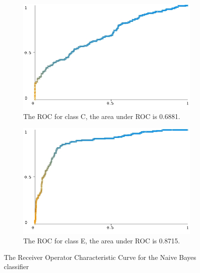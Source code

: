 \documentclass[10pt]{article}
\begin{document}
\begin{figure}
\begin{subfigure}[b]{0.475\textwidth}
        \centering 
        \includegraphics[width=\textwidth]{bayes_roc/roc_curve_c.jpg}
        \caption[]%
        {{\small The ROC for class C, the area under ROC is 0.6881.}}    
        \label{fig:bayes roc curve class c}
    \end{subfigure}
    \quad
    \begin{subfigure}[b]{0.475\textwidth}   
        \centering 
        \includegraphics[width=\textwidth]{bayes_roc/roc_curve_e(d).jpg}
        \caption[]%
        {{\small The ROC for class E, the area under ROC is 0.8715.}}    
        \label{fig:bayes roc curve class d}
    \end{subfigure}
    \caption[The Receiver Operator Characteristic Curve for the Naive Bayes classifier]
    {\small The Receiver Operator Characteristic Curve for the Naive Bayes classifier} 
    \label{fig:naive bayes roc curves}
\end{figure}
\end{document}
